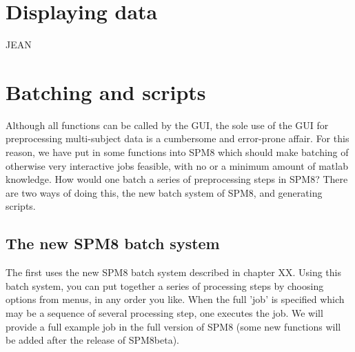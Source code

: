 \section{Displaying data}
JEAN


\section{Batching and scripts}
Although all functions can be called by the GUI, the sole use 
of the GUI for preprocessing multi-subject data is a cumbersome 
and error-prone affair. For this reason, we have put in some functions 
into SPM8 which should make batching of otherwise very interactive jobs 
feasible, with no or a minimum amount of matlab knowledge.
How would one batch a series of preprocessing steps in SPM8? 
There are two ways of doing this, the new batch system of SPM8, and generating scripts. 

\subsection{The new SPM8 batch system}
The first uses the new SPM8 batch system described in chapter XX. 
Using this batch system, you can put together a series of processing
steps by choosing options from menus, in any order you like. 
When the full 'job' is specified which may be a sequence of several 
processing step, one executes the job. We will provide a full example
job in the full version of SPM8 (some new functions will be added after the release of SPM8beta). 


